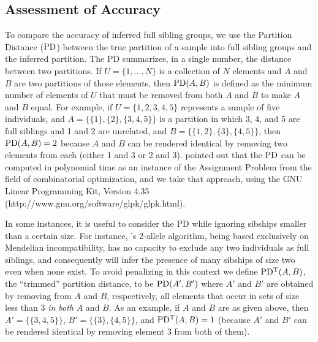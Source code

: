 \subsection*{Assessment of Accuracy}
To compare the accuracy of inferred full sibling groups,  we use the Partition Distance ($\mathrm{PD}$) between 
the true partition of a sample into full sibling groups and the inferred partition. The PD summarizes, 
in a single number, the distance between two partitions.  If $U=\{1,\ldots,N\}$ is a collection of $N$ 
elements and $A$ and $B$ are two partitions of those elements, then $\mathrm{PD}(A,B)$ is defined as the 
minimum number of elements of $U$ that must be removed from both $A$ and $B$ to make $A$ and $B$ equal.  
For example, if $U=\{1,2,3,4,5\}$ represents a sample of five individuals, and $A=\{\{1\},\{2\},
\{3,4,5\}\}$ is a partition in which 3, 4, and 5 are full siblings and 1 and 2 are  
unrelated, and $B=\{\{1,2\},\{3\},\{4,5\}\}$, then $\mathrm{PD}(A,B) = 2$ because $A$ and $B$ can be rendered 
identical by removing two elements from each (either 1 and 3 or 2 and 3).  \citet{gusfield02} pointed 
out that the $\mathrm{PD}$ can be computed in polynomial time as an instance of the Assignment Problem from the 
field of combinatorial optimization, and we take that approach, using the GNU Linear Programming Kit, 
Version 4.35 (http://www.gnu.org/software/glpk/glpk.html).

In some instances, it is useful to consider the PD while ignoring sibships smaller than a certain size.  
For instance, \kinalyzer{}'s 2-allele algorithm, being based exclusively on Mendelian incompatibility, has 
no capacity to exclude any two individuals as full siblings, and consequently will infer the presence 
of many sibships of size two even when none exist.  To avoid penalizing \kinalyzer{} in this context we 
define $\mathrm{PD^T}(A,B)$, the ``trimmed'' partition distance, to be $\mathrm{PD}(A',B')$ where $A'$ and $B'$ are 
obtained by removing from $A$ and $B$, respectively, all elements that occur in sets of size less than 
3 {\em in both} $A$ and $B$. As an example, if $A$ and $B$ are as given above, then $A'=\{\{3,4,5\}\}$, 
$B'=\{\{3\},\{4,5\}\}$, and $\mathrm{PD^T}(A,B)=1$ (because $A'$ and $B'$ can be rendered identical by removing 
element 3 from both of them).  

